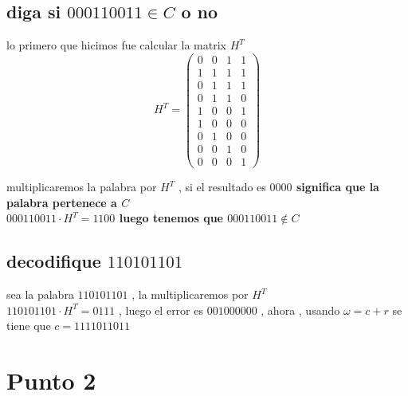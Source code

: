 \documentclass[10pt,a4paper]{article} %
\begin{document}
        \subsection{diga si $000110011 \in C$   o no}
            lo primero que hicimos fue calcular la matrix $H ^{T} $
            \begin{equation}
                H ^{T} = \begin{pmatrix}
                    0 & 0 & 1 & 1
                    \\
                    1 & 1 & 1 & 1
                    \\
                    0 & 1 & 1 & 1
                    \\
                    0 & 1 & 1 & 0
                    \\
                    1 & 0 & 0 & 1
                    \\
                    1 & 0 & 0 & 0
                    \\
                    0 & 1 & 0 & 0
                    \\
                    0 & 0 & 1 & 0
                    \\
                    0 & 0 & 0 & 1
                \end{pmatrix}
            \end{equation}

            multiplicaremos la palabra por $H ^{T}  $ , si el resultado es
            \textbf{$0000$ significa que la palabra pertenece a $C$}
            \\
            \textbf{$000110011 \cdot H ^{T}  = 1100$ luego tenemos que $000110011
            \notin C$}

        \subsection{decodifique $110101101$}
            sea la palabra $110101101$ , la multiplicaremos por $H ^{T}  $
            \\
            $110101101 \cdot H ^{T}  = 0111$ , luego el error es $001000000$ ,
            ahora , usando $\omega = c + r $ se tiene que $c = 1111011011$


    \section{Punto 2}
\end{document}
